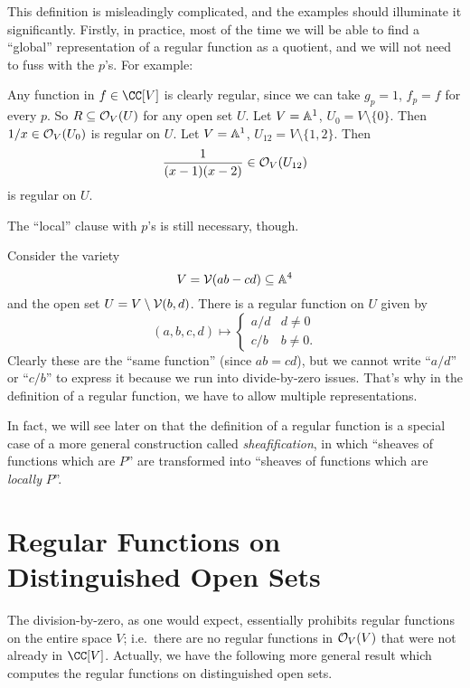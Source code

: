 This definition is misleadingly complicated,
and the examples should illuminate it significantly.
Firstly, in practice, most of the time we will be able to find
a ``global'' representation of a regular function as a quotient,
and we will not need to fuss with the $p$'s.
For example:
\begin{example}
	\listhack
	\begin{enumerate}[(a)]
		\ii Any function in $f \in \CC[V]$ is clearly regular,
		since we can take $g_p = 1$, $f_p = f$ for every $p$.
		So $R \subseteq \mathcal O_V(U)$ for any open set $U$.
		\ii Let $V = \mathbb A^1$, $U_0 = V \setminus \{0\}$.
		Then $1/x \in \mathcal O_V(U_0)$ is regular on $U$.
		\ii Let $V = \mathbb A^1$, $U_{12} = V \setminus \{1,2\}$. Then 
		\[ \frac{1}{(x-1)(x-2)} \in \mathcal O_V(U_{12}) \]
		is regular on $U$.
	\end{enumerate}
\end{example}
The ``local'' clause with $p$'s is still necessary, though.
\begin{example}
	\label{ex:local_rep}
	Consider the variety
	\[ V = \mathcal V(ab-cd) \subseteq \mathbb A^4 \]
	and the open set $U = V \setminus \mathcal V(b,d)$.
	There is a regular function on $U$ given by
	\[
		(a,b,c,d)
		\mapsto
		\begin{cases}
			a/d & d \neq 0 \\
			c/b & b \neq 0.
		\end{cases}
	\]
	Clearly these are the ``same function'' (since $ab=cd$),
	but we cannot write ``$a/d$'' or ``$c/b$''
	to express it because we run into divide-by-zero issues.
	That's why in the definition of a regular function,
	we have to allow multiple representations.
\end{example}

In fact, we will see later on that the definition
of a regular function is a special case of a more
general construction called \emph{sheafification},
in which ``sheaves of functions which are $P$'' are transformed
into ``sheaves of functions which are \emph{locally} $P$''.

\section{Regular Functions on Distinguished Open Sets}
The division-by-zero, as one would expect,
essentially prohibits regular functions on the entire space $V$;
i.e.\ there are no regular functions in $\mathcal O_V(V)$
that were not already in $\CC[V]$.
Actually, we have the following more general result which computes the
regular functions on distinguished open sets.

